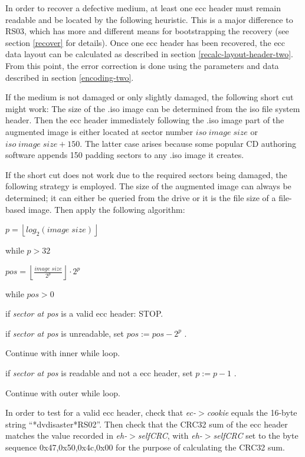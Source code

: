 In order to recover a defective medium, at least one ecc header must
remain readable and be located by the following heuristic. This
is a major difference to RS03, which has more and different means
for bootstrapping the recovery (see section \ref{recover} for details).
Once one ecc header has been recovered, the ecc data layout can be
calculated as described in section \ref{recalc-layout-header-two}.
From this point, the error correction is done using the parameters
and data described in section \ref{encoding-two}.

\smallskip

If the medium is not damaged or only slightly damaged, the following
short cut might work: The size of the .iso image can be determined
from the iso file system header. Then the ecc header immediately
following the .iso image part of the augmented image is either
located at sector number $iso\;image\;size$ or $iso\;image\;size + 150$.
The latter case arises because some popular CD authoring software
appends 150 padding sectors to any .iso image it creates. 

\smallskip

If the short cut does not work due to the required sectors being damaged,
the following strategy is employed. The size of the augmented image
can always be determined; it can either be queried from the drive or
it is the file size of a file-based image. Then apply the following
algorithm:

\bigskip

$p = \left\lfloor log_2(image\; size)\right\rfloor$

while $p > 32$

\quad $pos = \left\lfloor\frac{image\; size}{2^p}\right\rfloor \cdot 2^p$

\smallskip

\quad while $pos > 0$

\qquad if {\em sector at pos} is a valid ecc header: STOP.

\qquad if {\em sector at pos} is unreadable, set $pos := pos - 2^p$ .

\hspace*{13mm} Continue with inner while loop.

\qquad if {\em sector at pos} is readable and not a ecc header, set $p := p -1$ .

\hspace*{13mm} Continue with outer while loop.

\bigskip

In order to test for a valid ecc header, check that {\em ec-$>$cookie}
equals the 16-byte string ``*dvdisaster*RS02''. Then check that the
CRC32 sum of the ecc header matches the value recorded in {\em eh-$>$selfCRC},
with {\em eh-$>$selfCRC} set to the byte sequence 0x47,0x50,0x4c,0x00
for the purpose of calculating the CRC32 sum.

